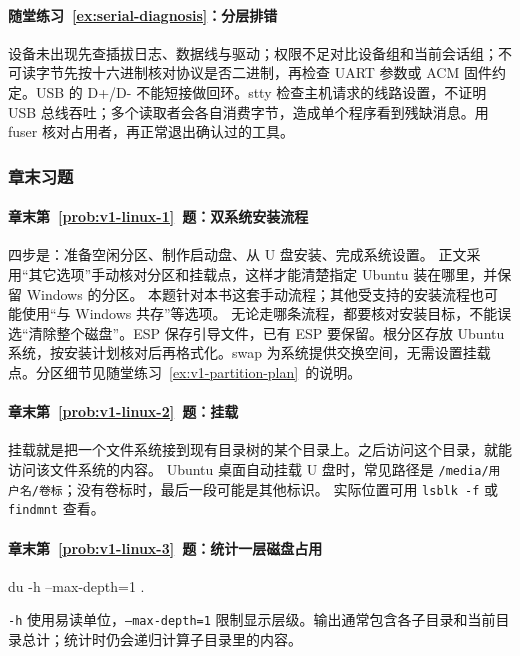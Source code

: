 \paragraph*{随堂练习~\ref{ex:serial-diagnosis}：分层排错}
\begin{solution}
设备未出现先查插拔日志、数据线与驱动；权限不足对比设备组和当前会话组；不可读字节先按十六进制核对协议是否二进制，再检查 UART 参数或 ACM 固件约定。USB 的 D+/D- 不能短接做回环。stty 检查主机请求的线路设置，不证明 USB 总线吞吐；多个读取者会各自消费字节，造成单个程序看到残缺消息。用 fuser 核对占用者，再正常退出确认过的工具。
\end{solution}

\subsubsection*{章末习题}

\paragraph*{章末第~\ref{prob:v1-linux-1}~题：双系统安装流程}
\begin{solution}
四步是：准备空闲分区、制作启动盘、从 U 盘安装、完成系统设置。
正文采用“其它选项”手动核对分区和挂载点，这样才能清楚指定 Ubuntu 装在哪里，并保留 Windows 的分区。
本题针对本书这套手动流程；其他受支持的安装流程也可能使用“与 Windows 共存”等选项。
无论走哪条流程，都要核对安装目标，不能误选“清除整个磁盘”。ESP 保存引导文件，已有 ESP 要保留。根分区存放 Ubuntu 系统，按安装计划核对后再格式化。swap 为系统提供交换空间，无需设置挂载点。分区细节见随堂练习~\ref{ex:v1-partition-plan}~的说明。
\end{solution}

\paragraph*{章末第~\ref{prob:v1-linux-2}~题：挂载}
\begin{solution}
挂载就是把一个文件系统接到现有目录树的某个目录上。之后访问这个目录，就能访问该文件系统的内容。
Ubuntu 桌面自动挂载 U 盘时，常见路径是 \texttt{/media/用户名/卷标}；没有卷标时，最后一段可能是其他标识。
实际位置可用 \texttt{lsblk -f} 或 \texttt{findmnt} 查看。
\end{solution}

\paragraph*{章末第~\ref{prob:v1-linux-3}~题：统计一层磁盘占用}
\begin{solution}

\begin{tbash}
du -h --max-depth=1 .
\end{tbash}

\texttt{-h} 使用易读单位，\texttt{--max-depth=1} 限制显示层级。输出通常包含各子目录和当前目录总计；统计时仍会递归计算子目录里的内容。
\end{solution}

